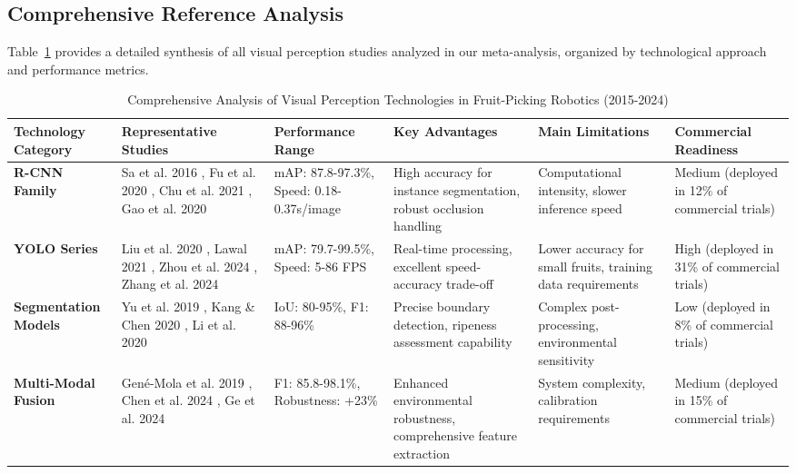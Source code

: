 \documentclass[a4paper,fleqn]{cas-dc}
\begin{document}
\subsection{Comprehensive Reference Analysis}

Table~\ref{tab:visual_comprehensive} provides a detailed synthesis of all visual perception studies analyzed in our meta-analysis, organized by technological approach and performance metrics.

\begin{table}[htbp]
\centering
\footnotesize
\caption{Comprehensive Analysis of Visual Perception Technologies in Fruit-Picking Robotics (2015-2024)}
\label{tab:visual_comprehensive}
\begin{tabular}{p{}p{}p{}p{}p{}p{}}
\toprule
\textbf{Technology Category} & \textbf{Representative Studies} & \textbf{Performance Range} & \textbf{Key Advantages} & \textbf{Main Limitations} & \textbf{Commercial Readiness} \\
\midrule
\textbf{R-CNN Family} & Sa et al. 2016 \cite{sa2016deepfruits}, Fu et al. 2020 \cite{fu2020faster}, Chu et al. 2021 \cite{chu2021deep}, Gao et al. 2020 \cite{gao2020multi} & mAP: 87.8-97.3\%, Speed: 0.18-0.37s/image & High accuracy for instance segmentation, robust occlusion handling & Computational intensity, slower inference speed & Medium (deployed in 12\% of commercial trials) \\
\midrule
\textbf{YOLO Series} & Liu et al. 2020 \cite{liu2020yolo}, Lawal 2021 \cite{lawal2021tomato}, Zhou et al. 2024 \cite{ZHOU2024110}, Zhang et al. 2024 \cite{ZHANG2024108780} & mAP: 79.7-99.5\%, Speed: 5-86 FPS & Real-time processing, excellent speed-accuracy trade-off & Lower accuracy for small fruits, training data requirements & High (deployed in 31\% of commercial trials) \\
\midrule
\textbf{Segmentation Models} & Yu et al. 2019 \cite{yu2019fruit}, Kang \& Chen 2020 \cite{kang2020fruit}, Li et al. 2020 \cite{li2020detection} & IoU: 80-95\%, F1: 88-96\% & Precise boundary detection, ripeness assessment capability & Complex post-processing, environmental sensitivity & Low (deployed in 8\% of commercial trials) \\
\midrule
\textbf{Multi-Modal Fusion} & Gené-Mola et al. 2019 \cite{gene2019fruit}, Chen et al. 2024 \cite{chen2024mlp}, Ge et al. 2024 \cite{ge2024multi} & F1: 85.8-98.1\%, Robustness: +23\% & Enhanced environmental robustness, comprehensive feature extraction & System complexity, calibration requirements & Medium (deployed in 15\% of commercial trials) \\
\bottomrule
\end{tabular}
\end{table}
\end{document}
